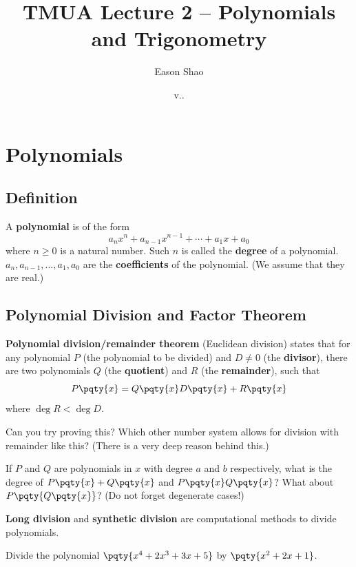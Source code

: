 \documentclass{article}
\title{TMUA Lecture 2 -- Polynomials and Trigonometry}
\author{Eason Shao}
\date{v.\DATE.\COMMITSHA}
\begin{document}
\maketitle

\tableofcontents

\section{Polynomials}
\subsection{Definition}
A \textbf{polynomial} is of the form
\[
    a_n x^n + a_{n - 1} x^{n - 1} + \cdots + a_1 x + a_0
\]
where \(n \geq 0\) is a natural number. Such \(n\) is called the \textbf{degree} of a polynomial. \(a_n, a_{n - 1}, \ldots, a_1, a_0\) are the \textbf{coefficients} of the polynomial. (We assume that they are real.)

\subsection{Polynomial Division and Factor Theorem}
\textbf{Polynomial division/remainder theorem} (Euclidean division) states that for any polynomial \(P\) (the polynomial to be divided) and \(D \neq 0\) (the \textbf{divisor}), there are two polynomials \(Q\) (the \textbf{quotient}) and \(R\) (the \textbf{remainder}), such that
\[
    P \pqty{x} = Q \pqty{x} D\pqty{x} + R \pqty{x}
\]
where \(\deg R < \deg D\).

\begin{problem}
    Can you try proving this? Which other number system allows for division with remainder like this? (There is a very deep reason behind this.)
\end{problem}

\begin{problem}
    If \(P\) and \(Q\) are polynomials in \(x\) with degree \(a\) and \(b\) respectively, what is the degree of \(P\pqty{x} + Q\pqty{x}\) and \(P\pqty{x}Q\pqty{x}\)? What about \(P\pqty{Q\pqty{x}}\)? (Do not forget degenerate cases!)
\end{problem}

\textbf{Long division} and \textbf{synthetic division} are computational methods to divide polynomials.

\begin{example}
    Divide the polynomial \(\pqty{x^4 + 2 x^3 + 3x + 5}\) by \(\pqty{x^2 + 2x + 1}\).
\end{example}
\end{document}
